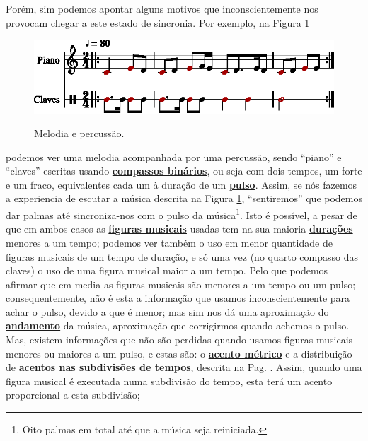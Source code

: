 Porém, sim podemos apontar alguns motivos que inconscientemente nos provocam chegar a este estado de sincronia.
Por exemplo, na Figura \ref{ritmo:procurando-pulso1} 
\begin{figure}[!h]
\centering
    \href{https://drive.google.com/file/d/1ECtQVizRJiJncQevJOfqvhTJZZNi8Mx2/view?usp=sharing}{\includegraphics[width=\textwidth]{chapters/cap-musicalidade-percepcion/procurando-pulso1-1.eps}}
\caption{Melodia e percussão.}
\label{ritmo:procurando-pulso1}
\end{figure}
podemos ver uma melodia acompanhada por uma percussão,
sendo ``piano'' e ``claves'' escritas usando  \hyperref[subsec:compassobinario]{\textbf{compassos binários}}, 
ou seja com dois tempos, um forte e um fraco, equivalentes cada um à duração de um \hyperref[ref:Pulso]{\textbf{pulso}}.
Assim, se nós fazemos a experiencia de escutar a música descrita na Figura \ref{ritmo:procurando-pulso1},
``sentiremos'' que podemos dar palmas até sincroniza-nos com o pulso da música\footnote{Oito
palmas em total até que a música seja reiniciada.}.
Isto é possível, 
a pesar de que em ambos casos as \hyperref[sec:figurasmusicais]{\textbf{figuras musicais}} usadas tem na sua maioria
\hyperref[sec:pos:Duracion]{\textbf{durações}} menores a um tempo;
podemos ver também o uso em menor quantidade de figuras musicais de um tempo de duração,
e só uma vez (no quarto compasso das claves) o uso de uma figura musical maior a um tempo. 
Pelo que podemos afirmar que em media as figuras musicais são menores a um tempo ou um pulso; consequentemente, 
não é esta a informação que usamos inconscientemente para achar o pulso,
devido a que é menor;
mas sim nos dá uma  aproximação do \hyperref[sec:Andamento]{\textbf{andamento}} da música,
aproximação que corrigirmos quando achemos o pulso.
Mas, existem informações que não são perdidas quando usamos figuras musicais menores ou maiores a um pulso,
e estas  são: o \hyperref[def:acentometrico]{\textbf{acento métrico}} e a 
distribuição de \hyperref[eq:acentosubdividio]{\textbf{acentos nas subdivisões de tempos}},
descrita na Pag. \pageref{eq:acentosubdividio}.
Assim, quando uma figura musical  é executada numa subdivisão do tempo, 
esta terá um acento proporcional a esta subdivisão;
